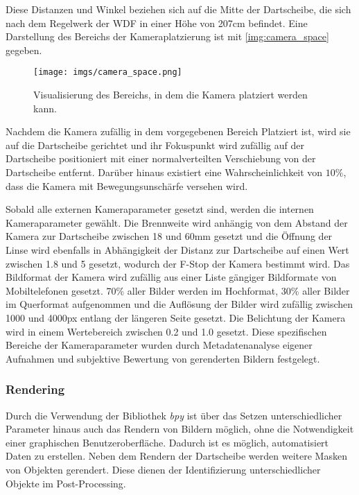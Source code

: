 Diese Distanzen und Winkel beziehen sich auf die Mitte der Dartscheibe, die sich nach dem Regelwerk der \ac{WDF} in einer Höhe von 207cm befindet. Eine Darstellung des Bereichs der Kameraplatzierung ist mit \autoref{img:camera_space} gegeben.

\begin{figure}
    \centering
    \texttt{[image: imgs/camera\_space.png]}
    \caption{Visualisierung des Bereichs, in dem die Kamera platziert werden kann.}
    \label{img:camera_space}
\end{figure}

Nachdem die Kamera zufällig in dem vorgegebenen Bereich Platziert ist, wird sie auf die Dartscheibe gerichtet und ihr Fokuspunkt wird zufällig auf der Dartscheibe positioniert mit einer normalverteilten Verschiebung von der Dartscheibe entfernt. Darüber hinaus existiert eine Wahrscheinlichkeit von $10\%$, dass die Kamera mit Bewegungsunschärfe versehen wird.

Sobald alle externen Kameraparameter gesetzt sind, werden die internen Kameraparameter gewählt. Die Brennweite wird anhängig von dem Abstand der Kamera zur Dartscheibe zwischen 18 und 60mm gesetzt und die Öffnung der Linse wird ebenfalls in Abhängigkeit der Distanz zur Dartscheibe auf einen Wert zwischen 1.8 und 5 gesetzt, wodurch der F-Stop der Kamera bestimmt wird. Das Bildformat der Kamera wird zufällig aus einer Liste gängiger Bildformate von Mobiltelefonen gesetzt. 70\% aller Bilder werden im Hochformat, 30\% aller Bilder im Querformat aufgenommen und die Auflösung der Bilder wird zufällig zwischen 1000 und 4000px entlang der längeren Seite gesetzt. Die Belichtung der Kamera wird in einem Wertebereich zwischen 0.2 und 1.0 gesetzt. Diese spezifischen Bereiche der Kameraparameter wurden durch Metadatenanalyse eigener Aufnahmen und subjektive Bewertung von gerenderten Bildern festgelegt.


\subsubsection{Rendering}
\label{sec:impl:daten:python:render}

Durch die Verwendung der Bibliothek \textit{bpy} ist über das Setzen unterschiedlicher Parameter hinaus auch das Rendern von Bildern möglich, ohne die Notwendigkeit einer graphischen Benutzeroberfläche. Dadurch ist es möglich, automatisiert Daten zu erstellen. Neben dem Rendern der Dartscheibe werden weitere Masken von Objekten gerendert. Diese dienen der Identifizierung unterschiedlicher Objekte im Post-Processing.

